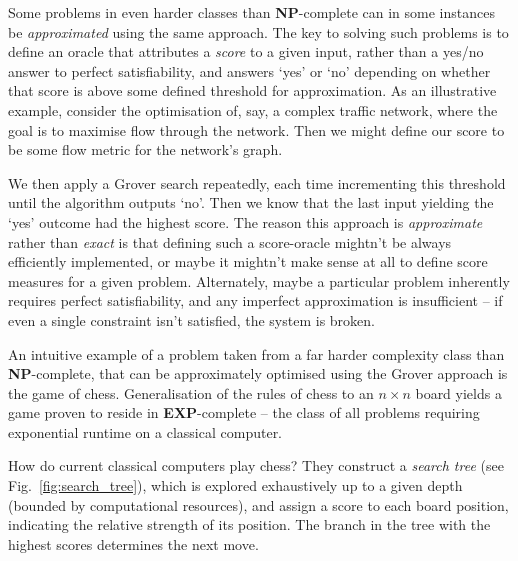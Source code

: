 Some problems in even harder classes than \textbf{NP}-complete can in some instances be \textit{approximated} using the same approach. The key to solving such problems is to define an oracle that attributes a \textit{score} to a given input, rather than a yes/no answer to perfect satisfiability, and answers `yes' or `no' depending on whether that score is above some defined threshold for approximation. As an illustrative example, consider the optimisation of, say, a complex traffic network, where the goal is to maximise flow through the network. Then we might define our score to be some flow metric for the network's graph.

We then apply a Grover search repeatedly, each time incrementing this threshold until the algorithm outputs `no'. Then we know that the last input yielding the `yes' outcome had the highest score. The reason this approach is \textit{approximate} rather than \textit{exact} is that defining such a score-oracle mightn't be always efficiently implemented, or maybe it mightn't make sense at all to define score measures for a given problem. Alternately, maybe a particular problem inherently requires perfect satisfiability, and any imperfect approximation is insufficient -- if even a single constraint isn't satisfied, the system is broken.

An intuitive example of a problem taken from a far harder complexity class than \textbf{NP}-complete, that can be approximately optimised using the Grover approach is the game of chess. Generalisation of the rules of chess to an \mbox{$n\times n$} board yields a game proven to reside in \textbf{EXP}-complete -- the class of all problems requiring exponential runtime on a classical computer.

How do current classical computers play chess? They construct a \textit{search tree} (see Fig.~\ref{fig:search_tree}), which is explored exhaustively up to a given depth (bounded by computational resources), and assign a score to each board position, indicating the relative strength of its position. The branch in the tree with the highest scores determines the next move.

